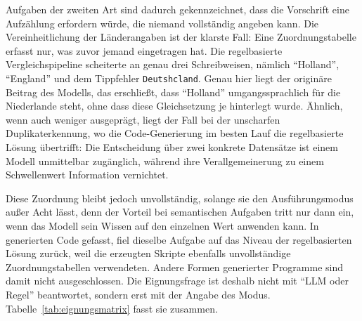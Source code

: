 Aufgaben der zweiten Art sind dadurch gekennzeichnet, dass die Vorschrift eine Aufzählung erfordern würde, die niemand vollständig angeben kann. Die Vereinheitlichung der Länderangaben ist der klarste Fall: Eine Zuordnungstabelle erfasst nur, was zuvor jemand eingetragen hat. Die regelbasierte Vergleichspipeline scheiterte an genau drei Schreibweisen, nämlich \enquote{Holland}, \enquote{England} und dem Tippfehler \texttt{Deutshcland}. Genau hier liegt der originäre Beitrag des Modells, das erschließt, dass \enquote{Holland} umgangssprachlich für die Niederlande steht, ohne dass diese Gleichsetzung je hinterlegt wurde. Ähnlich, wenn auch weniger ausgeprägt, liegt der Fall bei der unscharfen Duplikaterkennung, wo die Code-Generierung im besten Lauf die regelbasierte Lösung übertrifft: Die Entscheidung über zwei konkrete Datensätze ist einem Modell unmittelbar zugänglich, während ihre Verallgemeinerung zu einem Schwellenwert Information vernichtet.

Diese Zuordnung bleibt jedoch unvollständig, solange sie den Ausführungsmodus außer Acht lässt, denn der Vorteil bei semantischen Aufgaben tritt nur dann ein, wenn das Modell sein Wissen auf den einzelnen Wert anwenden kann. In generierten Code gefasst, fiel dieselbe Aufgabe auf das Niveau der regelbasierten Lösung zurück, weil die erzeugten Skripte ebenfalls unvollständige Zuordnungstabellen verwendeten. Andere Formen generierter Programme sind damit nicht ausgeschlossen. Die Eignungsfrage ist deshalb nicht mit \enquote{\ac{LLM} oder Regel} beantwortet, sondern erst mit der Angabe des Modus. Tabelle~\ref{tab:eignungsmatrix} fasst sie zusammen.

